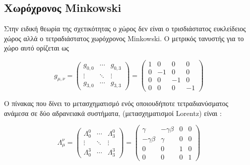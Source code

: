 \subsection{Χωρόχρονος \textlatin{Minkowski} }

Στην ειδική θεωρία της σχετικότητας ο χώρος δεν είναι ο τρισδιάστατος ευκλείδειος χώρος αλλά 
ο τετραδιάστατος χωρόχρονος \textlatin{Minkowski}. Ο μετρικός τανυστής για το χώρο αυτό ορίζεται ως 

\begin{equation}
  g_{\mu,\nu} =
  \begin{pmatrix}
    g_{0,0}  & \cdots & g_{0,3} \\
    \vdots & \ddots & \vdots \\
    g_{3,0}  & \cdots & g_{3,3}
  \end{pmatrix}
  =
  \begin{pmatrix}
    1 & 0 & 0 & 0 \\
    0 & -1 & 0 & 0 \\
    0 & 0 & -1 & 0 \\
    0 & 0 & 0 &-1
  \end{pmatrix}
\end{equation}

Ο πίνακας που δίνει το  μετασχηματισμό ενός οποιουδήποτε τετραδιανύσματος ανάμεσα σε δύο αδρανειακά συστήματα, (μετασχηματισμοί \textlatin{Lorentz}) είναι : 

\begin{equation}
  \Lambda_\mu ^\nu=
  \begin{pmatrix}
    \Lambda^0 _0  & \cdots & \Lambda^0 _3 \\
    \vdots & \ddots & \vdots \\
    \Lambda^3 _0  & \cdots & \Lambda^3 _3
  \end{pmatrix}
  =
  \begin{pmatrix}
    \gamma & -\gamma \beta& 0 & 0 \\
    -\gamma \beta & \gamma & 0 & 0 \\
    0 & 0 & 1 & 0 \\
    0 & 0 & 0 & 1
  \end{pmatrix} 
\end{equation}


